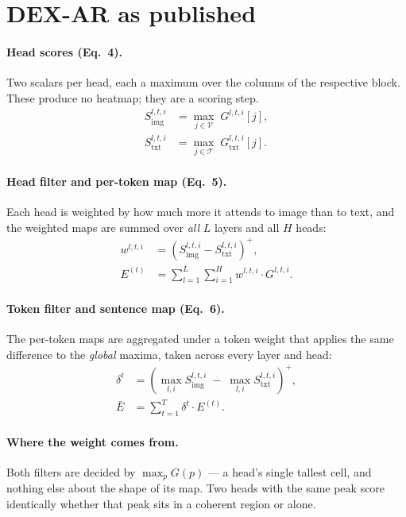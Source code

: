 \documentclass[11pt]{article}
\newcommand{\Vset}{\mathcal{V}}
\newcommand{\Tset}{\mathcal{T}}
\newcommand{\relu}[1]{\left(#1\right)^{+}}
\begin{document}
\section{DEX-AR as published}

\paragraph{Head scores (Eq.~4).} Two scalars per head, each a maximum over the
columns of the respective block. These produce no heatmap; they are a scoring
step.
\begin{align}
S^{l,t,i}_{\text{img}}  &= \max_{j \in \Vset} \; G^{l,t,i}[j], \label{eq:simg}\\
S^{l,t,i}_{\text{txt}} &= \max_{j \in \Tset} \; G^{l,t,i}_{\text{txt}}[j]. \label{eq:stext}
\end{align}

\paragraph{Head filter and per-token map (Eq.~5).} Each head is weighted by how
much more it attends to image than to text, and the weighted maps are summed
over \emph{all} $L$ layers and all $H$ heads:
\begin{align}
w^{l,t,i} &= \relu{S^{l,t,i}_{\text{img}} - S^{l,t,i}_{\text{txt}}}, \label{eq:w}\\
E^{(t)}   &= \sum_{l=1}^{L}\sum_{i=1}^{H} w^{l,t,i} \cdot G^{l,t,i}. \label{eq:etoken}
\end{align}

\paragraph{Token filter and sentence map (Eq.~6).} The per-token maps are
aggregated under a token weight that applies the same difference to the
\emph{global} maxima, taken across every layer and head:
\begin{align}
\delta^{t} &= \relu{\max_{l,i} S^{l,t,i}_{\text{img}} \;-\; \max_{l,i} S^{l,t,i}_{\text{txt}}}, \label{eq:delta}\\
\bar{E}    &= \sum_{t=1}^{T} \delta^{t} \cdot E^{(t)}. \label{eq:esent}
\end{align}

\paragraph{Where the weight comes from.} Both filters are decided by
$\max_p G(p)$ --- a head's single tallest cell, and nothing else about the shape
of its map. Two heads with the same peak score identically whether that peak sits
in a coherent region or alone.
\end{document}
